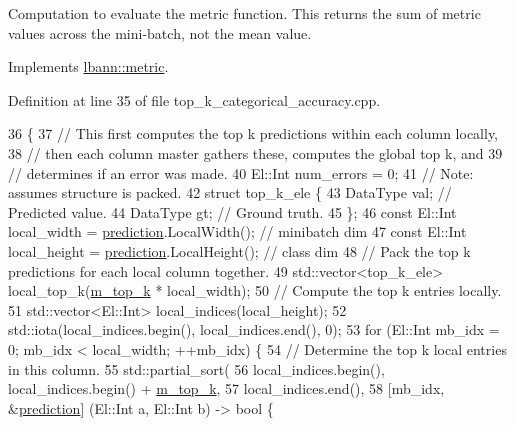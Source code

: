 Computation to evaluate the metric function. This returns the sum of metric values across the mini-\/batch, not the mean value. 

Implements \hyperlink{classlbann_1_1metric_aab79147ff480675db2e01d7a889a4296}{lbann\+::metric}.



Definition at line 35 of file top\+\_\+k\+\_\+categorical\+\_\+accuracy.\+cpp.


\begin{DoxyCode}
36                                                                                              \{
37     \textcolor{comment}{// This first computes the top k predictions within each column locally,}
38     \textcolor{comment}{// then each column master gathers these, computes the global top k, and}
39     \textcolor{comment}{// determines if an error was made.}
40     El::Int num\_errors = 0;
41     \textcolor{comment}{// Note: assumes structure is packed.}
42     \textcolor{keyword}{struct }top\_k\_ele \{
43       DataType val;  \textcolor{comment}{// Predicted value.}
44       DataType gt;  \textcolor{comment}{// Ground truth.}
45     \};
46     \textcolor{keyword}{const} El::Int local\_width = \hyperlink{base_8hpp_a2781a159088df64ed7d47cc91c4dc0a8ac41b9ec75e920b610e8907e066074b30}{prediction}.LocalWidth();  \textcolor{comment}{// minibatch dim}
47     \textcolor{keyword}{const} El::Int local\_height = \hyperlink{base_8hpp_a2781a159088df64ed7d47cc91c4dc0a8ac41b9ec75e920b610e8907e066074b30}{prediction}.LocalHeight();  \textcolor{comment}{// class dim}
48     \textcolor{comment}{// Pack the top k predictions for each local column together.}
49     std::vector<top\_k\_ele> local\_top\_k(\hyperlink{classlbann_1_1top__k__categorical__accuracy__metric_a6cc172f6799bffac44de06d0657efdeb}{m\_top\_k} * local\_width);
50     \textcolor{comment}{// Compute the top k entries locally.}
51     std::vector<El::Int> local\_indices(local\_height);
52     std::iota(local\_indices.begin(), local\_indices.end(), 0);
53     \textcolor{keywordflow}{for} (El::Int mb\_idx = 0; mb\_idx < local\_width; ++mb\_idx) \{
54       \textcolor{comment}{// Determine the top k local entries in this column.}
55       std::partial\_sort(
56         local\_indices.begin(), local\_indices.begin() + \hyperlink{classlbann_1_1top__k__categorical__accuracy__metric_a6cc172f6799bffac44de06d0657efdeb}{m\_top\_k},
57         local\_indices.end(),
58         [mb\_idx, &\hyperlink{base_8hpp_a2781a159088df64ed7d47cc91c4dc0a8ac41b9ec75e920b610e8907e066074b30}{prediction}] (El::Int a, El::Int b) -> \textcolor{keywordtype}{bool} \{

\end{DoxyCode}
